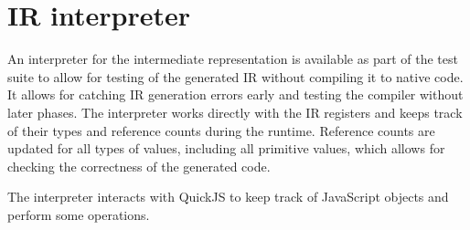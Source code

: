 \section{IR interpreter}

An interpreter for the intermediate representation is available as part of the test suite to allow for testing of the generated IR without compiling it to native code. It allows for catching IR generation errors early and testing the compiler without later phases. The interpreter works directly with the IR registers and keeps track of their types and reference counts during the runtime. Reference counts are updated for all types of values, including all primitive values, which allows for checking the correctness of the generated code.

The interpreter interacts with QuickJS to keep track of JavaScript objects and perform some operations.
